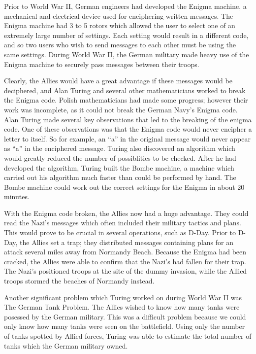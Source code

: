 \documentclass[12pt]{article}
\theoremstyle{mystyle}
\begin{document}
Prior to World War II, German engineers had developed the Enigma machine, a
mechanical and electrical device used for enciphering written messages.
The Enigma machine had 3 to 5 rotors which allowed the user to select one of
an extremely large number of settings. Each setting would result in a different
code, and so two users who wish to send messages to each other must be
using the same settings. During World War II, the German military made heavy use
of the Enigma machine to securely pass messages between their troops.

Clearly, the Allies would have a
great advantage if these messages would be deciphered, and Alan Turing and
several other mathematicians worked to break the Enigma code. Polish
mathematicians had made some progress; however their work was incomplete, as it
could not break the German Navy's Enigma code. Alan Turing made several key
observations that led to the breaking of the enigma code. One of these
observations was that the Enigma code would never encipher a letter to itself.
So for example, an ``a'' in the original message would never appear as ``a'' in 
the enciphered message. Turing also discovered an algorithm which would greatly
reduced the number of possiblities to be checked. After he had developed the
algorithm, Turing built the Bombe machine, a machine which carried out his
algorithm much faster than could be performed by hand. The Bombe machine could
work out the correct settings for the Enigma in about 20 minutes.

With the Enigma code broken, the Allies now had a huge advantage. They could
read the Nazi's messages which often included their military tactics and plans. 
This would prove to be crucial in several operations, such as D-Day. Prior to
D-Day, the Allies set a trap; they distributed messages containing plans for an
attack several miles away from Normandy Beach. Because the Enigma had been
cracked, the Allies were able to confirm that the Nazi's had fallen for their
trap. The Nazi's positioned troops at the site of the dummy invasion, while the
Allied troops stormed the beaches of Normandy instead.

Another significant problem which Turing worked on during World War II was The
German Tank Problem. The Allies wished to know how many tanks were posessed by
the German military. This was a difficult problem because we could only know how
many tanks were seen on the battlefield. Using only the number of tanks spotted
by Allied forces, Turing was able to estimate the total number of tanks which
the German military owned.
\end{document}
